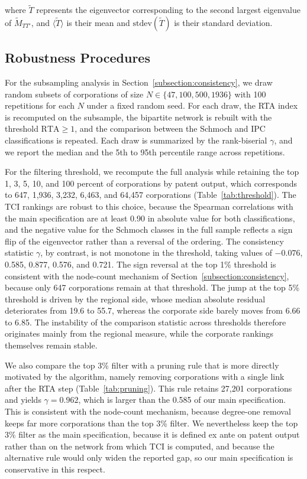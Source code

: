 \documentclass[lineno,pdflatex,sn-mathphys-num]{sn-jnl}%
\theoremstyle{thmstyleone}%
\theoremstyle{thmstyletwo}%
\theoremstyle{thmstylethree}%
\begin{document}
where \(\widetilde{T}\) represents the eigenvector corresponding to the second largest eigenvalue of \(\widetilde{M}_{TT'}\), and \(\langle \widetilde{T} \rangle\) is their mean and \(\text{stdev}(\widetilde{T})\) is their standard deviation.

\subsection{Robustness Procedures}\label{subsection:robustness}

For the subsampling analysis in Section~\ref{subsection:consistency}, we draw random subsets of corporations of size $N \in \{47, 100, 500, 1936\}$ with 100 repetitions for each $N$ under a fixed random seed.
For each draw, the RTA index is recomputed on the subsample, the bipartite network is rebuilt with the threshold $\mbox{RTA} \geq 1$, and the comparison between the Schmoch and IPC classifications is repeated.
Each draw is summarized by the rank-biserial $\gamma$, and we report the median and the 5th to 95th percentile range across repetitions.

For the filtering threshold, we recompute the full analysis while retaining the top 1, 3, 5, 10, and 100 percent of corporations by patent output, which corresponds to 647, 1,936, 3,232, 6,463, and 64,457 corporations (Table~\ref{tab:threshold}).
The TCI rankings are robust to this choice, because the Spearman correlations with the main specification are at least 0.90 in absolute value for both classifications, and the negative value for the Schmoch classes in the full sample reflects a sign flip of the eigenvector rather than a reversal of the ordering.
The consistency statistic $\gamma$, by contrast, is not monotone in the threshold, taking values of $-0.076$, 0.585, 0.877, 0.576, and 0.721.
The sign reversal at the top 1\% threshold is consistent with the node-count mechanism of Section~\ref{subsection:consistency}, because only 647 corporations remain at that threshold.
The jump at the top 5\% threshold is driven by the regional side, whose median absolute residual deteriorates from 19.6 to 55.7, whereas the corporate side barely moves from 6.66 to 6.85.
The instability of the comparison statistic across thresholds therefore originates mainly from the regional measure, while the corporate rankings themselves remain stable.

We also compare the top 3\% filter with a pruning rule that is more directly motivated by the algorithm, namely removing corporations with a single link after the RTA step (Table~\ref{tab:pruning}).
This rule retains 27,201 corporations and yields $\gamma = 0.962$, which is larger than the 0.585 of our main specification.
This is consistent with the node-count mechanism, because degree-one removal keeps far more corporations than the top 3\% filter.
We nevertheless keep the top 3\% filter as the main specification, because it is defined ex ante on patent output rather than on the network from which TCI is computed, and because the alternative rule would only widen the reported gap, so our main specification is conservative in this respect.
\end{document}
